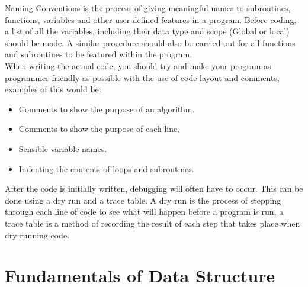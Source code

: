 \documentclass[a4paper]{article}
\begin{document}
			Naming Conventions is the process of giving meaningful names to subroutines, functions, variables and other user-defined features in a program. Before coding, a list of all the variables, including their data type and scope (Global or local) should be made. A similar procedure should also be carried out for all functions and subroutines to be featured within the program.\\
			When writing the actual code, you should try and make your program as programmer-friendly  as possible with the use of code layout and comments, examples of this would be:
			\begin{itemize}
				\setlength\itemsep{0cm}
				\item Comments to show the purpose of an algorithm.
				\item Comments to show the purpose of each line.
				\item Sensible variable names.
				\item Indenting the contents of loops and subroutines.
			\end{itemize}
			After the code is initially written, debugging will often have to occur. This can be done using a dry run and a trace table. A dry run is the process of stepping through each line of code to see what will happen before a program is run, a trace table is a method of recording the result of each step that takes place when dry running code.
	\section{Fundamentals of Data Structure}
\end{document}

